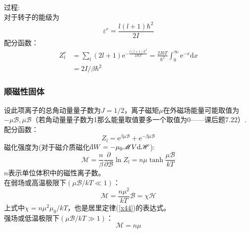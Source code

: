 \documentclass[12pt]{article}
\newcommand \dbar {{\; \bar{} \hspace{-0.3em} \mathrm d}}%
\begin{document}
过程:\\
对于转子的能级为
\begin{equation}
	\varepsilon^r=\frac{l(l+1)\hbar^2}{2I}
\end{equation}
配分函数：
\begin{equation}
	\begin{split}
	Z_l^r&=\sum_l (2l+1)\mathrm{e}^{-\frac{l(l+1)\hbar^2}{2IkT}}=\frac{2IkT}{\hbar^2}\int_{0}^{\infty}\mathrm{e}^{-x}\mathrm{d}x\\
	&=2I/\beta\hbar^2		
\end{split}
\end{equation}
\subsubsection{顺磁性固体}
\noindent
设此项离子的总角动量量子数为$J=1/2$，离子磁矩$\mu$在外磁场能量可能取值为$-\mu \mathscr{B}, \mu\mathscr{B}$（若角动量量子数为1那么能量取值要多一个取值为0——课后题7.22）.\\
配分函数：
\begin{equation}
	Z_l=\mathrm{e}^{\beta\mu\mathscr{B}}+\mathrm{e}^{-\beta\mu\mathscr{B}}
\end{equation}
磁化强度为(对于磁介质磁化$\dbar W=-\mu_0 \mathscr{M}V\mathrm{d}\mathscr{H}$):
\begin{equation}
	\mathscr{M}=\frac{n}{\beta}\frac{\partial}{\partial \mathscr{B}}\ln Z_l=n\mu \tanh \frac{\mu\mathscr{B}}{kT}
\end{equation}
$n$表示单位体积中的磁性离子数。\\
在弱场或高温极限下$(\mu \mathscr{B}/kT\ll1)$：
\begin{equation}
	\mathscr{M}=\frac{n\mu^2}{kT}\mathscr{B}=\chi \mathscr{H}
	\label{x45}
\end{equation}
上式中$\chi=n\mu^2\mu_0/kT$，也是居里定律(\ref{x44})的表达式。\\
强场或低温极限下$(\mu \mathscr{B}/kT\gg1)$：
\begin{equation}
	\mathscr{M}=n\mu
\end{equation}
\end{document}
